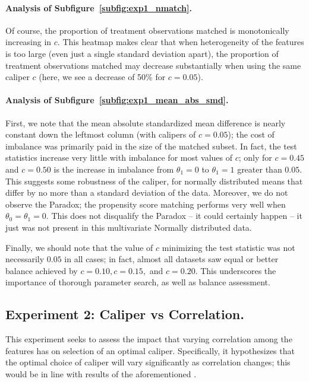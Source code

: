 \documentclass[11pt]{extarticle}
\begin{document}
\paragraph{Analysis of Subfigure~\ref{subfig:exp1_nmatch}.} Of course, the proportion of treatment observations matched is monotonically increasing in $c$. This heatmap makes clear that when heterogeneity of the features is too large (even just a single standard deviation apart), the proportion of treatment observations matched may decrease substantially when using the same caliper $c$ (here, we see a decrease of 50\% for $c = 0.05$).
\paragraph{Analysis of Subfigure~\ref{subfig:exp1_mean_abs_smd}.} First, we note that the mean absolute standardized mean difference is nearly constant down the leftmost column (with calipers of $c=0.05$); the cost of imbalance was primarily paid in the size of the matched subset. In fact, the test statistics increase very little with imbalance for most values of $c$; only for $c = 0.45$ and $c = 0.50$ is the increase in imbalance from $\theta_1 = 0$ to $\theta_1 = 1$ greater than $0.05$. This suggests some robustness of the caliper, for normally distributed means that differ by no more than a standard deviation of the data. Moreover, we do not observe the Paradox; the propensity score matching performs very well when $\theta_0 = \theta_1 = 0$. This does not disqualify the Paradox -- it could certainly happen -- it just was not present in this multivariate Normally distributed data.

Finally, we should note that the value of $c$ minimizing the test statistic was not necessarily $0.05$ in all cases; in fact, almost all datasets saw equal or better balance achieved by $c = 0.10, c = 0.15,$ and $c = 0.20$. This underscores the importance of thorough parameter search, as well as balance assessment.

\subsection{Experiment 2: Caliper vs Correlation.}
This experiment seeks to assess the impact that varying correlation among the features has on selection of an optimal caliper. Specifically, it hypothesizes that the optimal choice of caliper will vary significantly as correlation changes; this would be in line with results of the aforementioned \textcite{austin_optimal_2011}.
\end{document}

